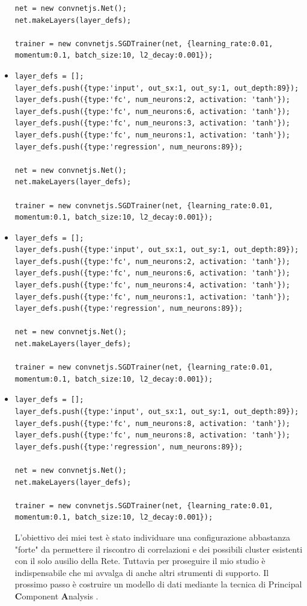 \begin{itemize}
\begin{verbatim}
net = new convnetjs.Net();
net.makeLayers(layer_defs);

trainer = new convnetjs.SGDTrainer(net, {learning_rate:0.01, 
momentum:0.1, batch_size:10, l2_decay:0.001});
\end{verbatim}

\item \begin{verbatim}
layer_defs = [];
layer_defs.push({type:'input', out_sx:1, out_sy:1, out_depth:89});
layer_defs.push({type:'fc', num_neurons:2, activation: 'tanh'});
layer_defs.push({type:'fc', num_neurons:6, activation: 'tanh'});
layer_defs.push({type:'fc', num_neurons:3, activation: 'tanh'});
layer_defs.push({type:'fc', num_neurons:1, activation: 'tanh'});
layer_defs.push({type:'regression', num_neurons:89});

net = new convnetjs.Net();
net.makeLayers(layer_defs);

trainer = new convnetjs.SGDTrainer(net, {learning_rate:0.01, 
momentum:0.1, batch_size:10, l2_decay:0.001});
\end{verbatim}

\item \begin{verbatim}
layer_defs = [];
layer_defs.push({type:'input', out_sx:1, out_sy:1, out_depth:89});
layer_defs.push({type:'fc', num_neurons:2, activation: 'tanh'});
layer_defs.push({type:'fc', num_neurons:6, activation: 'tanh'});
layer_defs.push({type:'fc', num_neurons:4, activation: 'tanh'});
layer_defs.push({type:'fc', num_neurons:1, activation: 'tanh'});
layer_defs.push({type:'regression', num_neurons:89});

net = new convnetjs.Net();
net.makeLayers(layer_defs);

trainer = new convnetjs.SGDTrainer(net, {learning_rate:0.01, 
momentum:0.1, batch_size:10, l2_decay:0.001});
\end{verbatim}


\item \begin{verbatim}
layer_defs = [];
layer_defs.push({type:'input', out_sx:1, out_sy:1, out_depth:89});
layer_defs.push({type:'fc', num_neurons:8, activation: 'tanh'});
layer_defs.push({type:'fc', num_neurons:8, activation: 'tanh'});
layer_defs.push({type:'regression', num_neurons:89});

net = new convnetjs.Net();
net.makeLayers(layer_defs);

trainer = new convnetjs.SGDTrainer(net, {learning_rate:0.01, 
momentum:0.1, batch_size:10, l2_decay:0.001});
\end{verbatim}
\noindent
L'obiettivo dei miei test \`e stato individuare una configurazione abbastanza "forte" da permettere il riscontro di correlazioni e dei possibili cluster esistenti con il solo ausilio della Rete. Tuttavia per proseguire il mio studio \`e indispensabile che mi avvalga di anche altri strumenti di supporto. Il prossimo passo \`e costruire un modello di dati mediante la tecnica di {P}rincipal \textbf{C}omponent \textbf{A}nalysis .
\end{itemize}

